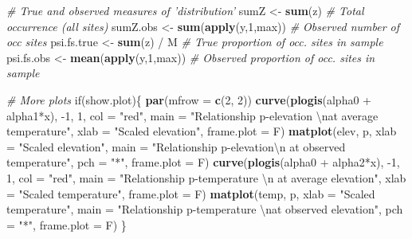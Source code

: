 \documentclass[]{book}
\newenvironment{Shaded}{\begin{snugshade}}{\end{snugshade}}
\newcommand{\KeywordTok}[1]{\textcolor[rgb]{0.13,0.29,0.53}{\textbf{{#1}}}}
\newcommand{\DataTypeTok}[1]{\textcolor[rgb]{0.13,0.29,0.53}{{#1}}}
\newcommand{\DecValTok}[1]{\textcolor[rgb]{0.00,0.00,0.81}{{#1}}}
\newcommand{\CharTok}[1]{\textcolor[rgb]{0.31,0.60,0.02}{{#1}}}
\newcommand{\StringTok}[1]{\textcolor[rgb]{0.31,0.60,0.02}{{#1}}}
\newcommand{\CommentTok}[1]{\textcolor[rgb]{0.56,0.35,0.01}{\textit{{#1}}}}
\newcommand{\NormalTok}[1]{{#1}}
\begin{document}
\begin{Shaded}
\begin{Highlighting}[]
\CommentTok{# True and observed measures of 'distribution'}
\NormalTok{sumZ <-}\StringTok{ }\KeywordTok{sum}\NormalTok{(z)                     }\CommentTok{# Total occurrence (all sites)}
\NormalTok{sumZ.obs <-}\StringTok{ }\KeywordTok{sum}\NormalTok{(}\KeywordTok{apply}\NormalTok{(y,}\DecValTok{1}\NormalTok{,max))    }\CommentTok{# Observed number of occ sites}
\NormalTok{psi.fs.true <-}\StringTok{ }\KeywordTok{sum}\NormalTok{(z) /}\StringTok{ }\NormalTok{M          }\CommentTok{# True proportion of occ. sites in sample}
\NormalTok{psi.fs.obs <-}\StringTok{ }\KeywordTok{mean}\NormalTok{(}\KeywordTok{apply}\NormalTok{(y,}\DecValTok{1}\NormalTok{,max)) }\CommentTok{# Observed proportion of occ. sites in sample}

\CommentTok{# More plots}
\NormalTok{if(show.plot)\{}
  \KeywordTok{par}\NormalTok{(}\DataTypeTok{mfrow =} \KeywordTok{c}\NormalTok{(}\DecValTok{2}\NormalTok{, }\DecValTok{2}\NormalTok{))}
  \KeywordTok{curve}\NormalTok{(}\KeywordTok{plogis}\NormalTok{(alpha0 +}\StringTok{ }\NormalTok{alpha1*x), -}\DecValTok{1}\NormalTok{, }\DecValTok{1}\NormalTok{, }\DataTypeTok{col =} \StringTok{"red"}\NormalTok{, }
      \DataTypeTok{main =} \StringTok{"Relationship p-elevation }\CharTok{\textbackslash{}n}\StringTok{at average temperature"}\NormalTok{, }
      \DataTypeTok{xlab =} \StringTok{"Scaled elevation"}\NormalTok{, }\DataTypeTok{frame.plot =} \NormalTok{F)}
  \KeywordTok{matplot}\NormalTok{(elev, p, }\DataTypeTok{xlab =} \StringTok{"Scaled elevation"}\NormalTok{, }
        \DataTypeTok{main =} \StringTok{"Relationship p-elevation}\CharTok{\textbackslash{}n}\StringTok{ at observed temperature"}\NormalTok{, }
        \DataTypeTok{pch =} \StringTok{"*"}\NormalTok{, }\DataTypeTok{frame.plot =} \NormalTok{F)}
  \KeywordTok{curve}\NormalTok{(}\KeywordTok{plogis}\NormalTok{(alpha0 +}\StringTok{ }\NormalTok{alpha2*x), -}\DecValTok{1}\NormalTok{, }\DecValTok{1}\NormalTok{, }\DataTypeTok{col =} \StringTok{"red"}\NormalTok{, }
      \DataTypeTok{main =} \StringTok{"Relationship p-temperature }\CharTok{\textbackslash{}n}\StringTok{ at average elevation"}\NormalTok{, }
      \DataTypeTok{xlab =} \StringTok{"Scaled temperature"}\NormalTok{, }\DataTypeTok{frame.plot =} \NormalTok{F)}
  \KeywordTok{matplot}\NormalTok{(temp, p, }\DataTypeTok{xlab =} \StringTok{"Scaled temperature"}\NormalTok{, }
        \DataTypeTok{main =} \StringTok{"Relationship p-temperature }\CharTok{\textbackslash{}n}\StringTok{at observed elevation"}\NormalTok{, }
        \DataTypeTok{pch =} \StringTok{"*"}\NormalTok{, }\DataTypeTok{frame.plot =} \NormalTok{F)}
\NormalTok{\}}


\end{Highlighting}
\end{Shaded}
\end{document}
